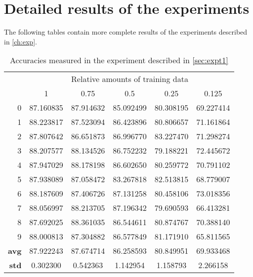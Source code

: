 

\chapter{Detailed results of the experiments} \label{app:exp_res}

The following tables contain more complete results of the experiments described in \cref{ch:exp}.

\begin{table}[h]
\begin{tabular}{r||c|c|c|c|c}
\toprule
& \multicolumn{5}{c}{Relative amounts of training data} \\
&          1 &       0.75 &        0.5 &       0.25 &      0.125 \\
\midrule
0   &  87.160835 &  87.914632 &  85.092499 &  80.308195 &  69.227414 \\
1   &  88.223817 &  87.523094 &  86.423896 &  80.806657 &  71.161864 \\
2   &  87.807642 &  86.651873 &  86.996770 &  83.227470 &  71.298274 \\
3   &  88.207577 &  88.134526 &  86.752232 &  79.188221 &  72.445672 \\
4   &  87.947029 &  88.178198 &  86.602650 &  80.259772 &  70.791102 \\
\midrule
5   &  87.938089 &  87.058472 &  83.267818 &  82.513815 &  68.779007 \\
6   &  88.187609 &  87.406726 &  87.131258 &  80.458106 &  73.018356 \\
7   &  88.056997 &  88.213705 &  87.196342 &  79.690593 &  66.413281 \\
8   &  87.692025 &  88.361035 &  86.544611 &  80.874767 &  70.388140 \\
9   &  88.000813 &  87.304882 &  86.577849 &  81.171910 &  65.811565 \\
\hline
\textbf{avg} &  87.922243 &  87.674714 &  86.258593 &  80.849951 &  69.933468 \\
\hline
\textbf{std} &   0.302300 &   0.542363 &   1.142954 &   1.158793 &   2.266158 \\
\bottomrule
\end{tabular}

\caption[All measured accuracies using supervised ULMFiT]{Accuracies measured in the experiment described in \cref{sec:expt1}}
\label{tab:exp1_complete}
\end{table}


